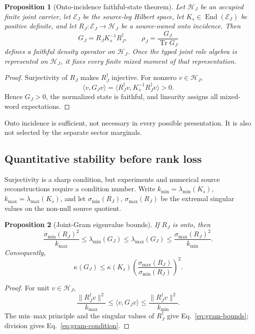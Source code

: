 \documentclass[11pt]{article}
\newtheorem{proposition}{Proposition}
\newcommand{\Tr}{\operatorname{Tr}}
\newcommand{\End}{\operatorname{End}}
\begin{document}
\begin{proposition}[Onto-incidence faithful-state theorem]
Let \(\mathcal H_J\) be an occupied finite joint carrier, let
\(\mathcal E_J\) be the source-leg Hilbert space, let
\(K_s\in\End(\mathcal E_J)\) be positive definite, and let
\(R_J:\mathcal E_J\to\mathcal H_J\) be a source-owned onto incidence.  Then
\begin{equation}
 G_J=R_JK_s^{-1}R_J^\dagger,
 \qquad
 \rho_J=\frac{G_J}{\Tr G_J}
 \label{eq:joint-gram-state}
\end{equation}
defines a faithful density operator on \(\mathcal H_J\).  Once the typed joint
role algebra is represented on \(\mathcal H_J\), it fixes every finite mixed
moment of that representation.
\end{proposition}
\begin{proof}
Surjectivity of \(R_J\) makes \(R_J^\dagger\) injective.  For nonzero
\(v\in\mathcal H_J\),
\begin{equation}
 \langle v,G_Jv\rangle
 =\langle R_J^\dagger v,K_s^{-1}R_J^\dagger v\rangle>0.
\end{equation}
Hence \(G_J>0\), the normalized state is faithful, and linearity assigns all
mixed-word expectations.
\end{proof}

Onto incidence is sufficient, not necessary in every possible presentation.
It is also not selected by the separate sector marginals.

\subsection{Quantitative stability before rank loss}

Surjectivity is a sharp condition, but experiments and numerical source
reconstructions require a condition number.  Write
\(k_{\min}=\lambda_{\min}(K_s)\),
\(k_{\max}=\lambda_{\max}(K_s)\), and let
\(\sigma_{\min}(R_J)\), \(\sigma_{\max}(R_J)\) be the extremal singular values
on the non-null source quotient.

\begin{proposition}[Joint-Gram eigenvalue bounds]
If \(R_J\) is onto, then
\begin{equation}
 \frac{\sigma_{\min}(R_J)^2}{k_{\max}}
 \le \lambda_{\min}(G_J)
 \le \lambda_{\max}(G_J)
 \le \frac{\sigma_{\max}(R_J)^2}{k_{\min}}.
 \label{eq:gram-bounds}
\end{equation}
Consequently,
\begin{equation}
 \kappa(G_J)\le
 \kappa(K_s)\left(\frac{\sigma_{\max}(R_J)}{\sigma_{\min}(R_J)}\right)^2.
 \label{eq:gram-condition}
\end{equation}
\end{proposition}
\begin{proof}
For unit \(v\in\mathcal H_J\),
\begin{equation}
 \frac{\lVert R_J^\dagger v\rVert^2}{k_{\max}}
 \le \langle v,G_Jv\rangle
 \le \frac{\lVert R_J^\dagger v\rVert^2}{k_{\min}}.
\end{equation}
The min--max principle and the singular values of \(R_J^\dagger\) give
Eq.~\eqref{eq:gram-bounds}; division gives
Eq.~\eqref{eq:gram-condition}.
\end{proof}
\end{document}
